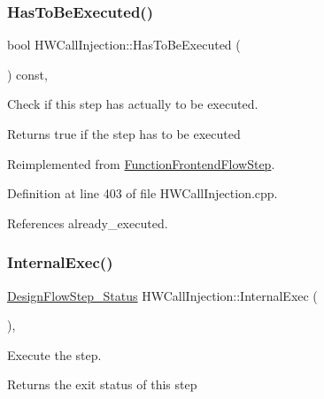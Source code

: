 \subsubsection{\texorpdfstring{Has\+To\+Be\+Executed()}{HasToBeExecuted()}}
{\footnotesize\ttfamily bool H\+W\+Call\+Injection\+::\+Has\+To\+Be\+Executed (\begin{DoxyParamCaption}{ }\end{DoxyParamCaption}) const\hspace{0.3cm}{\ttfamily [override]}, {\ttfamily [virtual]}}



Check if this step has actually to be executed. 

\begin{DoxyReturn}{Returns}
true if the step has to be executed 
\end{DoxyReturn}


Reimplemented from \hyperlink{classFunctionFrontendFlowStep_a12e786363530aa9533e4bd9380130d75}{Function\+Frontend\+Flow\+Step}.



Definition at line 403 of file H\+W\+Call\+Injection.\+cpp.



References already\+\_\+executed.

\mbox{\label{classHWCallInjection_a7c601b025163eef724680f402f8ff6c0}} 
\subsubsection{\texorpdfstring{Internal\+Exec()}{InternalExec()}}
{\footnotesize\ttfamily \hyperlink{design__flow__step_8hpp_afb1f0d73069c26076b8d31dbc8ebecdf}{Design\+Flow\+Step\+\_\+\+Status} H\+W\+Call\+Injection\+::\+Internal\+Exec (\begin{DoxyParamCaption}{ }\end{DoxyParamCaption})\hspace{0.3cm}{\ttfamily [override]}, {\ttfamily [virtual]}}



Execute the step. 

\begin{DoxyReturn}{Returns}
the exit status of this step 
\end{DoxyReturn}


